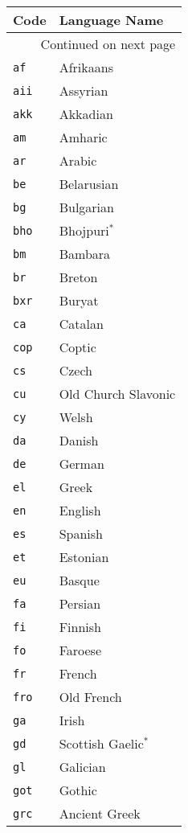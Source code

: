 \begin{longtable}{|l|l|}
\hline \multicolumn{1}{|l|}{\textbf{Code}} &
\multicolumn{1}{l|}{\textbf{Language Name}} \\ \hline \hline
\endhead

\hline \multicolumn{2}{|r|}{{Continued on next page}} \\ 
\hline
\endfoot
\endlastfoot
    \label{tab:langISO}
\texttt{af} & Afrikaans\\
\texttt{aii} & Assyrian \\
\texttt{akk} & Akkadian\\
\texttt{am} & Amharic \\
\texttt{ar} & Arabic \\
\texttt{be} & Belarusian \\
\texttt{bg} & Bulgarian \\
\texttt{bho} & Bhojpuri\(^{*}\) \\
\texttt{bm} & Bambara \\
\texttt{br} & Breton \\
\texttt{bxr} & Buryat \\
\texttt{ca} & Catalan \\
\texttt{cop} & Coptic \\
\texttt{cs} & Czech \\
\texttt{cu} & Old Church Slavonic \\
\texttt{cy} & Welsh \\
\texttt{da} & Danish \\
\texttt{de} & German \\
\texttt{el} & Greek \\
\texttt{en} & English \\
\texttt{es} & Spanish \\
\texttt{et} & Estonian \\
\texttt{eu} & Basque \\
\texttt{fa} & Persian \\
\texttt{fi} & Finnish \\
\texttt{fo} & Faroese \\
\texttt{fr} & French \\
\texttt{fro} & Old French \\
\texttt{ga} & Irish \\
\texttt{gd} & Scottish Gaelic\(^{*}\) \\
\texttt{gl} & Galician \\
\texttt{got} & Gothic \\
\texttt{grc} & Ancient Greek \\

\end{longtable}

